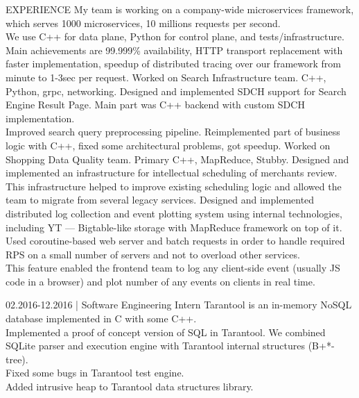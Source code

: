\documentclass[12pt]{cutecv}
\begin{document}
\begin{paracol}{2}
\begin{leftcolumn}
\end{leftcolumn}

\begin{rightcolumn}
\begin{cvsection}{EXPERIENCE}
  {My team is working on a company-wide microservices framework, which serves
  1000 microservices, 10 millions requests per second.\\
  We use C++ for data plane, Python for control plane, and tests/infrastructure.\\
  Main achievements are 99.999\% availability, HTTP transport replacement
  with faster implementation, speedup of distributed tracing over our
  framework from minute to 1-3sec per request.}
  {Worked on Search Infrastructure team. C++, Python, grpc, networking.
  Designed and implemented SDCH support for Search Engine Result Page.
  Main part was C++ backend with custom SDCH implementation.\\
  Improved search query preprocessing pipeline. Reimplemented part of business logic with C++, fixed some architectural problems, got speedup.}
  {Worked on Shopping Data Quality team. Primary C++, MapReduce, Stubby.
   Designed and implemented an infrastructure for intellectual scheduling of merchants review. This infrastructure helped to improve existing scheduling logic
   and allowed the team to migrate from several legacy services.}
  {Designed and implemented distributed log collection and event
   plotting system using internal technologies, including YT — Bigtable-like
   storage with MapReduce framework on top of it. \\
   Used coroutine-based web server and batch requests in order
   to handle required RPS on a small number of servers and not to overload
   other services. \\
   This feature enabled the frontend team to log any client-side
   event (usually JS code in a browser) and plot number of any events on
   clients in real time.}

  {02.2016-12.2016 | Software Engineering Intern}
  {Tarantool is an in-memory NoSQL database implemented in C with some C++.\\
   Implemented a proof of concept version of SQL in Tarantool.
   We combined SQLite parser and execution engine with Tarantool internal structures (B+*-tree).\\
   Fixed some bugs in Tarantool test engine.\\
   Added intrusive heap to Tarantool data structures library.}
\end{cvsection}


\end{rightcolumn}
\end{paracol}
\end{document}
